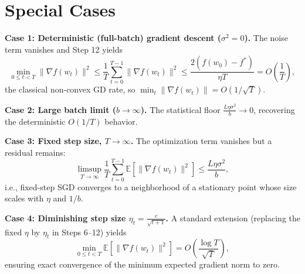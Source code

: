 \documentclass{article}
\begin{document}
\section*{Special Cases}

\textbf{Case 1: Deterministic (full-batch) gradient descent ($\sigma^2 = 0$).}
The noise term vanishes and Step 12 yields
\[
\min_{0\le t < T}\|\nabla f(w_t)\|^2 \le \frac{1}{T}\sum_{t=0}^{T-1}\|\nabla f(w_t)\|^2
\leq \frac{2(f(w_0)-f^*)}{\eta T} = O\!\left(\frac{1}{T}\right),
\]
the classical non-convex GD rate, so $\min_t\|\nabla f(w_t)\| = O(1/\sqrt{T})$.

\textbf{Case 2: Large batch limit ($b \to \infty$).}
The statistical floor $\frac{L\eta\sigma^2}{b} \to 0$, recovering the deterministic $O(1/T)$ behavior.

\textbf{Case 3: Fixed step size, $T \to \infty$.}
The optimization term vanishes but a residual remains:
\[
\limsup_{T\to\infty}\frac{1}{T}\sum_{t=0}^{T-1}\mathbb{E}[\|\nabla f(w_t)\|^2] \leq \frac{L\eta\sigma^2}{b},
\]
i.e., fixed-step SGD converges to a neighborhood of a stationary point whose size scales with $\eta$ and $1/b$.

\textbf{Case 4: Diminishing step size $\eta_t = \frac{c}{\sqrt{t+1}}$.}
A standard extension (replacing the fixed $\eta$ by $\eta_t$ in Steps 6--12) yields
\[
\min_{0\le t<T}\mathbb{E}[\|\nabla f(w_t)\|^2] = O\!\left(\frac{\log T}{\sqrt{T}}\right),
\]
ensuring exact convergence of the minimum expected gradient norm to zero.
\end{document}
